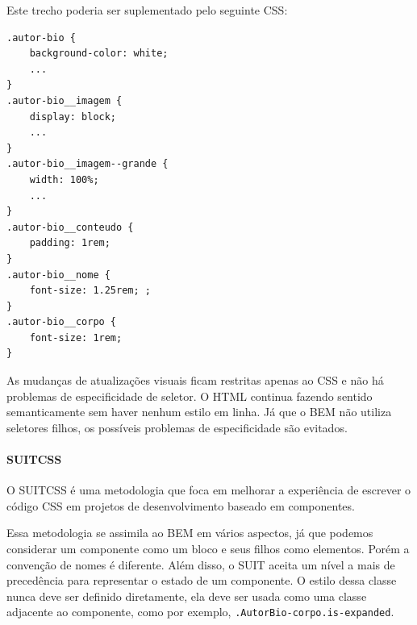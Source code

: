 \begin{Shaded}
\begin{Highlighting}[]
\KeywordTok{>}  
     \KeywordTok{>}  
    \KeywordTok{>}  
        \KeywordTok{>}  
        \KeywordTok{>} 
\end{Highlighting}
\end{Shaded}

Este trecho poderia ser suplementado pelo seguinte CSS:

\begin{verbatim}
.autor-bio { 
    background-color: white;
    ...
} 
.autor-bio__imagem { 
    display: block;
    ...
}
.autor-bio__imagem--grande { 
    width: 100%;
    ...
} 
.autor-bio__conteudo { 
    padding: 1rem; 
} 
.autor-bio__nome { 
    font-size: 1.25rem; ; 
} 
.autor-bio__corpo { 
    font-size: 1rem;
}
\end{verbatim}

As mudanças de atualizações visuais ficam restritas apenas ao CSS e não
há problemas de especificidade de seletor. O HTML continua fazendo
sentido semanticamente sem haver nenhum estilo em linha. Já que o BEM não utiliza seletores filhos, os possíveis problemas de especificidade são evitados.

\hypertarget{suitcss}{%
\paragraph{SUITCSS}\label{suitcss}}

O SUITCSS é uma metodologia que foca em melhorar a experiência de
escrever o código CSS em projetos de desenvolvimento baseado em
componentes.\nocite{suitcss}

Essa metodologia se assimila ao BEM em vários aspectos, já que
podemos considerar um componente como um bloco e seus filhos como
elementos. Porém a convenção de nomes é diferente. Além disso, o SUIT aceita um nível a mais de precedência para representar o estado de um componente. O estilo dessa classe nunca deve ser definido diretamente, ela deve ser usada como uma classe adjacente ao componente, como por exemplo, \texttt{.AutorBio-corpo.is-expanded}.

